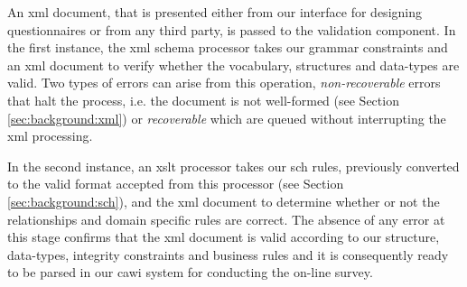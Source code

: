 	An \gls{xml} document, that is presented either from our interface for designing questionnaires or from any third party, is passed to the validation component. In the first instance, the \gls{xml} schema processor takes our grammar constraints and an \gls{xml} document to verify whether the vocabulary, structures and data-types are valid. Two types of errors can arise from this operation, \emph{non-recoverable} errors that halt the process, i.e. the document is not well-formed (see Section \ref{sec:background:xml}) or \emph{recoverable} which are queued without interrupting the \gls{xml} processing.

	In the second instance, an \gls{xslt} processor takes our \gls{sch} rules, previously converted to the valid format accepted from this processor (see Section \ref{sec:background:sch}), and the \gls{xml} document to determine whether or not the relationships and domain specific rules are correct. The absence of any error at this stage confirms that the \gls{xml} document is valid according to our structure, data-types, integrity constraints and business rules and it is consequently ready to be parsed in our \gls{cawi} system for conducting the on-line survey.


	


